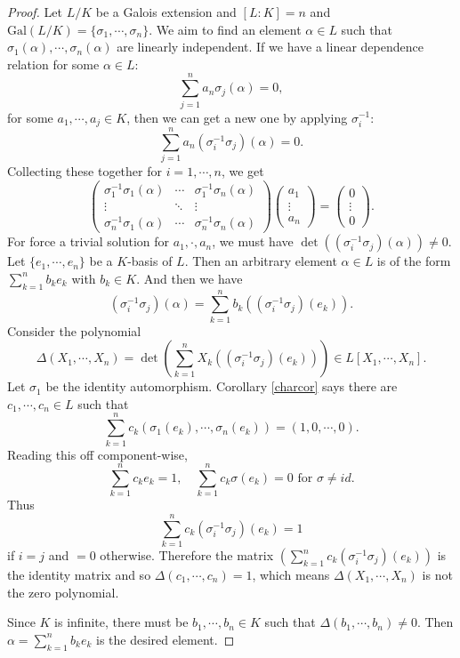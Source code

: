 \documentclass[12pt]{report}
\theoremstyle{definition}
\newcommand{\Gal}{\text{Gal}}
\begin{document}
\begin{proof}
	Let $L/K$ be a Galois extension and $[L:K]=n$ and $\Gal(L/K)=\{\sigma_1,\cdots,\sigma_n\}$. We aim to find an element $\alpha\in L$ such that $\sigma_1(\alpha),\cdots,\sigma_n(\alpha)$ are linearly independent.
	If we have a linear dependence relation for some $\alpha\in L$: $$\sum_{j=1}^n a_n\sigma_j(\alpha) = 0,$$ for some $a_1,\cdots,a_j\in K$, then we can get a new one by applying $\sigma_i^{-1}$: $$\sum_{j=1}^n a_n(\sigma_i^{-1}\sigma_j)(\alpha) = 0.$$
	Collecting these together for $i=1,\cdots,n$, we get $$\begin{pmatrix}
			\sigma_1^{-1}\sigma_1(\alpha) & \cdots & \sigma_1^{-1}\sigma_n(\alpha) \\
			\vdots                        & \ddots & \vdots                        \\
			\sigma_n^{-1}\sigma_1(\alpha) & \cdots & \sigma_n^{-1}\sigma_n(\alpha)
		\end{pmatrix} \begin{pmatrix}
			a_1    \\
			\vdots \\
			a_n
		\end{pmatrix} = \begin{pmatrix}
			0      \\
			\vdots \\
			0
		\end{pmatrix}.$$
	For force a trivial solution for $a_1,\cdot,a_n$, we must have $\det((\sigma_i^{-1}\sigma_j)(\alpha)) \not= 0.$
	Let $\{e_1,\cdots,e_n\}$ be a $K$-basis of $L$. Then an arbitrary element $\alpha\in L$ is of the form $\sum_{k=1}^n b_k e_k$ with $b_k\in K$. And then we have $$(\sigma_i^{-1}\sigma_j)(\alpha)=\sum_{k=1}^n b_k((\sigma_i^{-1}\sigma_j)(e_k)).$$
	Consider the polynomial $$\Delta(X_1,\cdots, X_n) = \det(\sum_{k=1}^n X_k((\sigma_i^{-1}\sigma_j)(e_k)))\in L[X_1,\cdots,X_n].$$
	Let $\sigma_1$ be the identity automorphism. Corollary \ref{charcor} says there are $c_1,\cdots, c_n\in L$ such that    $$\sum_{k=1}^nc_k(\sigma_1(e_k),\cdots,\sigma_n(e_k))=(1,0,\cdots,0).$$ Reading this off component-wise, $$\sum_{k=1}^n c_ke_k=1, \quad \sum_{k=1}^n c_k \sigma(e_k)=0 \mbox{ for }\sigma\not= id.$$
	Thus $$ \sum_{k=1}^n c_k (\sigma_i^{-1} \sigma_j)(e_k)=1$$ if $i=j$ and $=0$ otherwise. Therefore the matrix $(\sum_{k=1}^n c_k (\sigma_i^{-1} \sigma_j)(e_k))$ is the identity matrix and so $\Delta(c_1,\cdots,c_n)  =1 $, which means $\Delta(X_1,\cdots,X_n)$ is not the zero polynomial.

	Since $K$ is infinite, there must be $b_1,\cdots, b_n\in K$ such that $\Delta(b_1,\cdots,b_n)\not=0$. Then $\alpha=\sum_{k=1}^n b_k e_k$ is the desired element.
\end{proof}
\end{document}
